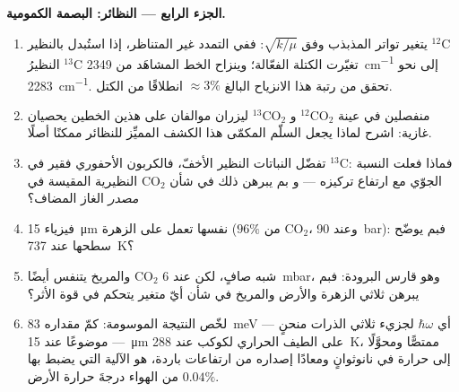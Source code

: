 \begin{problem}
\medskip\noindent\textbf{الجزء الرابع --- النظائر: البصمة
الكمومية.}
\begin{enumerate}[resume]
  \item يتغير تواتر المذبذب وفق $\sqrt{k/\mu}$: ففي التمدد
        غير المتناظر، إذا استُبدل بالنظير $^{12}$C النظيرُ $^{13}$C
        تغيّرت الكتلة الفعّالة؛ وينزاح الخط المشاهَد من
        \qty{2349}{cm^{-1}} إلى نحو \qty{2283}{cm^{-1}}. تحقق من
        رتبة هذا الانزياح البالغ $\approx 3\%$ انطلاقًا من
        الكتل.
  \item ليزران موالفان على هذين الخطين يحصيان $^{13}$CO$_2$ و
        $^{12}$CO$_2$ منفصلين في عينة غازية: اشرح لماذا يجعل
        السلّم المكمّى هذا الكشف المميِّز للنظائر ممكنًا أصلًا.
  \item تفضّل النباتات النظير الأخفّ، فالكربون الأحفوري
        فقير في $^{13}$C: فماذا فعلت النسبة النظيرية المقيسة في
        CO$_2$ الجوّي مع ارتفاع تركيزه --- و
        بم يبرهن ذلك في شأن \emph{مصدر} الغاز المضاف؟
  \item فيزياء \qty{15}{\micro m} نفسها تعمل على الزهرة
        ($96\%$ من CO$_2$، وعند \qty{90}{bar}): فبم يوضّح
        سطحها عند \qty{737}{K}؟
  \item والمريخ يتنفس أيضًا CO$_2$ شبه صافٍ، لكن عند \qty{6}{mbar}،
        وهو قارس البرودة: فبم يبرهن ثلاثي الزهرة والأرض والمريخ
        في شأن أيّ متغير يتحكم في قوة الأثر؟
  \item لخّص النتيجة الموسومة: كمّ مقداره \qty{83}{meV} ---
        أي $\hbar\omega$ لجزيء ثلاثي الذرات منحنٍ --- موضوعًا عند
        \qty{15}{\micro m} على الطيف الحراري لكوكب عند \qty{288}{K}،
        ممتصًّا ومحوَّلًا إلى حرارة في نانوثوانٍ ومعادًا
        إصداره من ارتفاعات باردة، هو الآلية التي يضبط بها
        $0.04\%$ من الهواء درجةَ حرارة الأرض.
\end{enumerate}
\end{problem}
